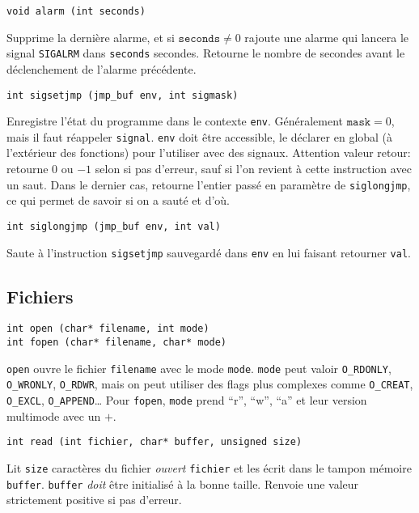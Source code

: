 \documentclass[a4paper]{article}
\begin{document}
\begin{multicols*}{2}
    \begin{lstlisting}
void alarm (int seconds)
    \end{lstlisting}
    Supprime la dernière alarme, et si $\texttt{seconds} \neq 0$ rajoute une alarme qui lancera le signal \texttt{SIGALRM} dans \texttt{seconds} secondes.
    Retourne le nombre de secondes avant le déclenchement de l'alarme précédente.

    \begin{lstlisting}
int sigsetjmp (jmp_buf env, int sigmask)
    \end{lstlisting}
    Enregistre l'état du programme dans le contexte \texttt{env}. Généralement $\texttt{mask} = 0$, mais il faut réappeler \texttt{signal}.
    \texttt{env} doit être accessible, le déclarer en global (à l'extérieur des fonctions) pour l'utiliser avec des signaux.
    Attention valeur retour: retourne $0$ ou $-1$ selon si pas d'erreur, sauf si l'on revient à cette instruction avec un saut.
    Dans le dernier cas, retourne l'entier passé en paramètre de \texttt{siglongjmp}, ce qui permet de savoir si on a sauté et d'où.

    \begin{lstlisting}
int siglongjmp (jmp_buf env, int val)
    \end{lstlisting}
    Saute à l'instruction \texttt{sigsetjmp} sauvegardé dans \texttt{env} en lui faisant retourner \texttt{val}.

    \subsection{Fichiers}

    \begin{lstlisting}
int open (char* filename, int mode)
int fopen (char* filename, char* mode)
    \end{lstlisting}
    \texttt{open} ouvre le fichier \texttt{filename} avec le mode \texttt{mode}. \texttt{mode} peut valoir \texttt{O\_RDONLY}, \texttt{O\_WRONLY}, \texttt{O\_RDWR}, mais on peut utiliser des flags plus complexes comme \texttt{O\_CREAT}, \texttt{O\_EXCL}, \texttt{O\_APPEND}\ldots
    Pour \texttt{fopen}, \texttt{mode} prend ``r'', ``w'', ``a'' et leur version multimode avec un $+$.

    \begin{lstlisting}
int read (int fichier, char* buffer, unsigned size)
    \end{lstlisting}
    Lit \texttt{size} caractères du fichier \emph{ouvert} \texttt{fichier} et les écrit dans le tampon mémoire \texttt{buffer}.
    \texttt{buffer} \emph{doit} être initialisé à la bonne taille. 
    Renvoie une valeur strictement positive si pas d'erreur.


\end{multicols*}
\end{document}
